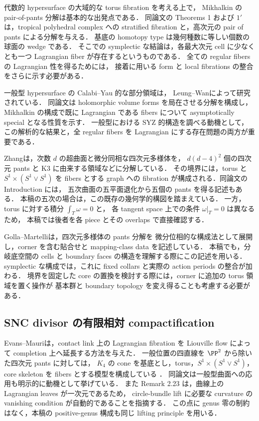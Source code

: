 代数的 hypersurface の大域的な torus fibration を考える上で，
Mikhalkin の pair-of-pants 分解\cite{Mikhalkin}は基本的な出発点である．
同論文の Theorems 1 および $1'$ は，tropical polyhedral complex への
stratified fibration と，高次元の pair of pants による分解を与える．
基底の homotopy type は幾何種数に等しい個数の球面の wedge である．
そこでの symplectic な結論は，各最大次元 cell に少なくとも一つ
Lagrangian fiber が存在するというものである．
全ての regular fibers の Lagrangian 性を得るためには，
接着に用いる form と local fibrations の整合をさらに示す必要がある．

一般型 hypersurface の Calabi--Yau 的な部分領域は，
Leung--Wan\cite{LeungWan}によって研究されている．
同論文は holomorphic volume forms を局在させる分解を構成し，
Mikhalkin の構成で既に Lagrangian である fibers について
asymptotically special となる性質を示す．
一般型における SYZ 的構造を調べる動機として，
この解析的な結果と，全 regular fibers を Lagrangian にする存在問題の両方が重要である．

Zhang\cite[Theorem 1.1]{Zhang}は，次数 $d$ の超曲面と微分同相な四次元多様体を，
$d(d-4)^2$ 個の四次元 pants と K3 に由来する領域などに分解している．
その境界には，torus と $S^1\times(S^1\vee S^1)$ を fibers とする graph への
fibration が構成される．同論文の Introduction には，
五次曲面の五平面退化から五個の pants を得る記述もある．
本稿の五次の場合は，この既存の幾何学的構図を踏まえている．
一方，torus に対する積分 $\int_T\omega=0$ と，
各 tangent space 上での条件 $\omega|_T=0$ は異なるため，
本稿では後者を各 piece とその overlaps で直接確認する．

Golla--Martelli\cite{GollaMartelli}は，四次元多様体の pants 分解を
微分位相的な構成法として展開し，corner を含む貼合せと mapping-class data を記述している．
本稿でも，分岐底空間の cells と boundary faces の構造を理解する際にこの記述を用いる．
symplectic な構成では，これに fixed collars と実際の action periods の整合が加わる．
境界を固定した core の置換を検討する際には，corner に追加の torus 領域を置く操作が
基本群と boundary topology を変え得ることも考慮する必要がある．

\subsection{SNC divisor の有限相対 compactification}

Evans--Mauri\cite{EM}は，contact link 上の Lagrangian fibration を
Liouville flow によって completion 上へ延長する方法を与えた．
一般位置の四直線を $\PP^2$ から除いた四次元 pants に対しては，
$K_4$ の cone を基底とし，torus，$S^1\times(S^1\vee S^1)$，
core skeleton を fibers とする模型を構成している
\cite[Lemmas 2.16, 2.22; \S3.1]{EM}．
同論文は一般型曲面への応用も明示的に動機として挙げている．
また Remark 2.23 は，曲線上の Lagrangian leaves が一次元であるため，
circle-bundle lift に必要な curvature の vanishing condition が自動的であることを指摘する．
この点に genus 零の制約はなく，本稿の positive-genus 構成も同じ lifting principle を用いる．


